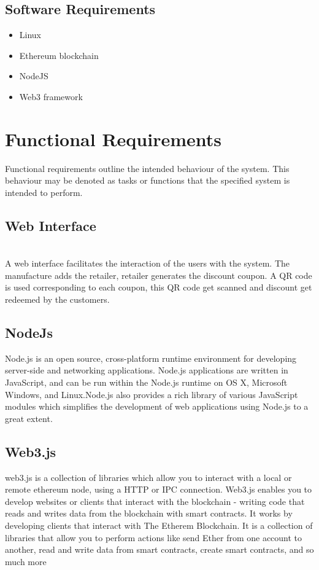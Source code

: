 \subsection{Software Requirements}
\begin{itemize}
    \item Linux
    \item Ethereum blockchain 
    \item NodeJS
    \item Web3 framework
\end{itemize}

\section{Functional Requirements}
Functional requirements outline the intended behaviour of the system. This behaviour may be denoted as tasks or functions that the specified system is intended to perform. 
\subsection{Web Interface} \\
A web interface facilitates the interaction of the users with the system. The
manufacture adds the retailer, retailer generates the discount coupon. A QR code
is used corresponding to each coupon, this QR code get scanned and discount get
redeemed by the customers.
\subsection{NodeJs}
Node.js is an open source, cross-platform runtime environment for developing server-side and networking applications. Node.js applications are written in JavaScript, and can be run within the Node.js runtime on OS X, Microsoft Windows, and Linux.Node.js also provides a rich library of various JavaScript modules which simplifies the development of web applications using Node.js to a great extent.
\subsection{Web3.js}
web3.js is a collection of libraries which allow you to interact with a local or remote ethereum node, using a HTTP or IPC connection. Web3.js enables you to develop websites or clients that interact with the blockchain - writing code that reads and writes data from the blockchain with smart contracts.  It works by developing clients that interact with The Etherem Blockchain. It is a collection of libraries that allow you to perform actions like send Ether from one account to another, read and write data from smart contracts, create smart contracts, and so much more
